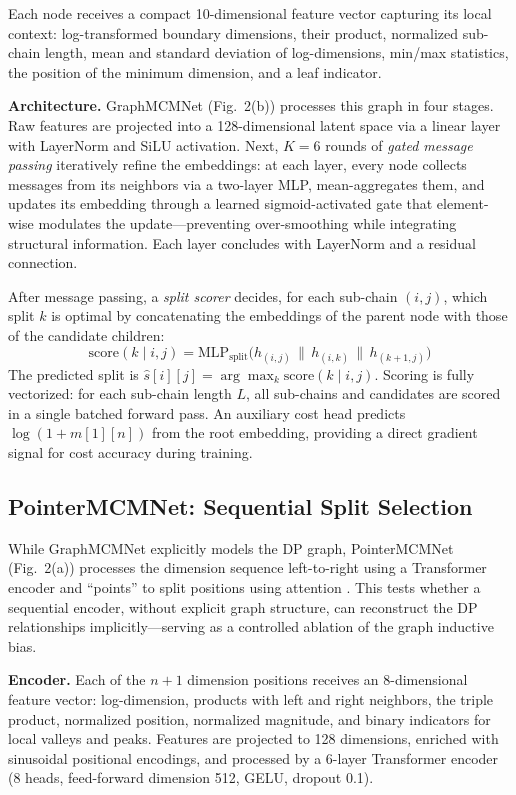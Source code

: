 \documentclass[conference]{IEEEtran}
\begin{document}
Each node receives a compact 10-dimensional feature vector capturing its local
context: log-transformed boundary dimensions, their product, normalized
sub-chain length, mean and standard deviation of log-dimensions, min/max
statistics, the position of the minimum dimension, and a leaf indicator.

\textbf{Architecture.} GraphMCMNet (Fig.~2(b)) processes this graph in four
stages. Raw features are projected into a 128-dimensional latent space via a
linear layer with LayerNorm and SiLU activation. Next, $K{=}6$ rounds of
\emph{gated message passing} iteratively refine the embeddings: at each layer,
every node collects messages from its neighbors via a two-layer MLP,
mean-aggregates them, and updates its embedding through a learned
sigmoid-activated gate that element-wise modulates the update---preventing
over-smoothing while integrating structural information. Each layer concludes
with LayerNorm and a residual connection.

After message passing, a \emph{split scorer} decides, for each sub-chain
$(i,j)$, which split $k$ is optimal by concatenating the embeddings of the
parent node with those of the candidate children:
\begin{equation}
\mathrm{score}(k \mid i,j) = \mathrm{MLP}_{\mathrm{split}}\bigl(h_{(i,j)} \,\|\, h_{(i,k)} \,\|\, h_{(k+1,j)}\bigr)
\end{equation}
The predicted split is $\hat{s}[i][j] = \arg\max_k \mathrm{score}(k \mid i,j)$.
Scoring is fully vectorized: for each sub-chain length $L$, all sub-chains and
candidates are scored in a single batched forward pass. An auxiliary cost head
predicts $\log(1 + m[1][n])$ from the root embedding, providing a direct
gradient signal for cost accuracy during training.

\subsection{PointerMCMNet: Sequential Split Selection}
While GraphMCMNet explicitly models the DP graph, PointerMCMNet (Fig.~2(a))
processes the dimension sequence left-to-right using a Transformer encoder
\cite{vaswani2017} and ``points'' to split positions using attention
\cite{vinyals2015,bahdanau2015}. This tests whether a sequential encoder,
without explicit graph structure, can reconstruct the DP relationships
implicitly---serving as a controlled ablation of the graph inductive bias.

\textbf{Encoder.} Each of the $n{+}1$ dimension positions receives an
8-dimensional feature vector: log-dimension, products with left and right
neighbors, the triple product, normalized position, normalized magnitude, and
binary indicators for local valleys and peaks. Features are projected to 128
dimensions, enriched with sinusoidal positional encodings, and processed by a
6-layer Transformer encoder (8 heads, feed-forward dimension 512, GELU,
dropout 0.1).
\end{document}
